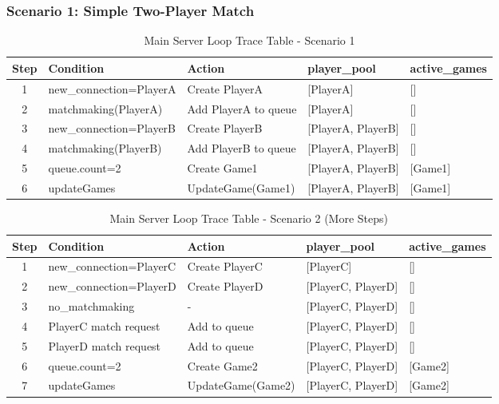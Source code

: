 \documentclass{article}
\begin{document}
\subsubsection{Scenario 1: Simple Two-Player Match}
\begin{table}[H]
\centering
\footnotesize
\begin{tabularx}{\textwidth}{|c|p{3.5cm}|X|p{2.5cm}|p{2.5cm}|}
\hline
\textbf{Step} & \textbf{Condition} & \textbf{Action} & \textbf{player\_pool} & \textbf{active\_games}\\
\hline
1 & new\_connection=PlayerA & Create PlayerA & [PlayerA] & []\\
\hline
2 & matchmaking(PlayerA) & Add PlayerA to queue & [PlayerA] & []\\
\hline
3 & new\_connection=PlayerB & Create PlayerB & [PlayerA, PlayerB] & []\\
\hline
4 & matchmaking(PlayerB) & Add PlayerB to queue & [PlayerA, PlayerB] & []\\
\hline
5 & queue.count=2 & Create Game1 & [PlayerA, PlayerB] & [Game1]\\
\hline
6 & updateGames & UpdateGame(Game1) & [PlayerA, PlayerB] & [Game1]\\
\hline
\end{tabularx}
\caption{Main Server Loop Trace Table - Scenario 1}
\end{table}

\begin{table}[H]
\centering
\footnotesize
\begin{tabularx}{\textwidth}{|c|p{3.5cm}|X|p{2.5cm}|p{2.5cm}|}
\hline
\textbf{Step} & \textbf{Condition} & \textbf{Action} & \textbf{player\_pool} & \textbf{active\_games}\\
\hline
1 & new\_connection=PlayerC & Create PlayerC & [PlayerC] & []\\
\hline
2 & new\_connection=PlayerD & Create PlayerD & [PlayerC, PlayerD] & []\\
\hline
3 & no\_matchmaking & - & [PlayerC, PlayerD] & []\\
\hline
4 & PlayerC match request & Add to queue & [PlayerC, PlayerD] & []\\
\hline
5 & PlayerD match request & Add to queue & [PlayerC, PlayerD] & []\\
\hline
6 & queue.count=2 & Create Game2 & [PlayerC, PlayerD] & [Game2]\\
\hline
7 & updateGames & UpdateGame(Game2) & [PlayerC, PlayerD] & [Game2]\\
\hline
\end{tabularx}
\caption{Main Server Loop Trace Table - Scenario 2 (More Steps)}
\end{table}
\end{document}
